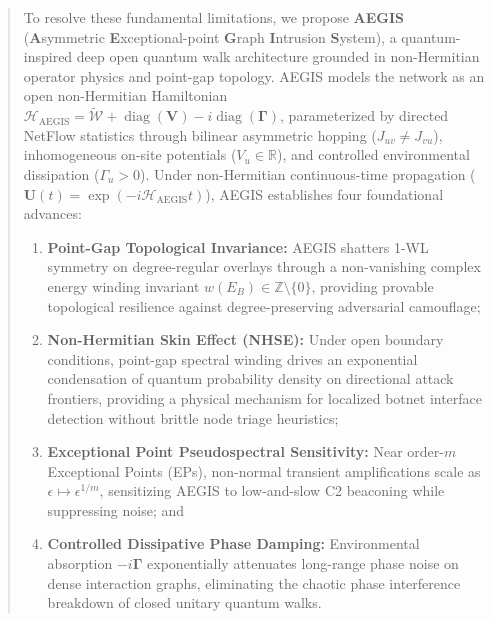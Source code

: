 \documentclass[10pt,twocolumn,letterpaper]{article}
\begin{document}
\begin{abstract}
To resolve these fundamental limitations, we propose \textbf{AEGIS} (\textbf{A}symmetric \textbf{E}xceptional-point \textbf{G}raph \textbf{I}ntrusion \textbf{S}ystem), a quantum-inspired deep open quantum walk architecture grounded in non-Hermitian operator physics and point-gap topology. AEGIS models the network as an open non-Hermitian Hamiltonian $\mathcal{H}_{\text{AEGIS}} = \tilde{\mathcal{W}} + \operatorname{diag}(\mathbf{V}) - i\operatorname{diag}(\boldsymbol{\Gamma})$, parameterized by directed NetFlow statistics through bilinear asymmetric hopping ($J_{uv} \ne J_{vu}$), inhomogeneous on-site potentials ($V_u \in \mathbb{R}$), and controlled environmental dissipation ($\Gamma_u > 0$). Under non-Hermitian continuous-time propagation ($\mathbf{U}(t) = \exp(-i \mathcal{H}_{\text{AEGIS}} t)$), AEGIS establishes four foundational advances:
\begin{enumerate}
    \item \textbf{Point-Gap Topological Invariance:} AEGIS shatters 1-WL symmetry on degree-regular overlays through a non-vanishing complex energy winding invariant $w(E_B) \in \mathbb{Z} \setminus \{0\}$, providing provable topological resilience against degree-preserving adversarial camouflage;
    \item \textbf{Non-Hermitian Skin Effect (NHSE):} Under open boundary conditions, point-gap spectral winding drives an exponential condensation of quantum probability density on directional attack frontiers, providing a physical mechanism for localized botnet interface detection without brittle node triage heuristics;
    \item \textbf{Exceptional Point Pseudospectral Sensitivity:} Near order-$m$ Exceptional Points (EPs), non-normal transient amplifications scale as $\epsilon \mapsto \epsilon^{1/m}$, sensitizing AEGIS to low-and-slow C2 beaconing while suppressing noise; and
    \item \textbf{Controlled Dissipative Phase Damping:} Environmental absorption $-i\boldsymbol{\Gamma}$ exponentially attenuates long-range phase noise on dense interaction graphs, eliminating the chaotic phase interference breakdown of closed unitary quantum walks.
\end{enumerate}


\end{abstract}
\end{document}
